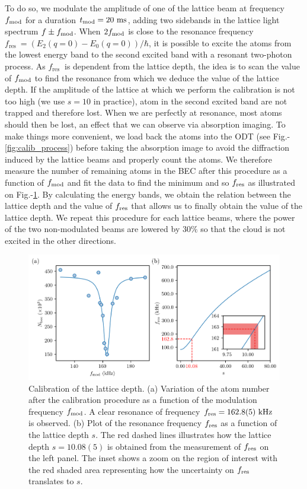 To do so, we modulate the amplitude of one of the lattice beam at frequency $f_{\rm{mod}}$ for a duration $t_{\rm{mod} }= 20 \ \rm{ms}$, adding two sidebands in the lattice light spectrum $f \pm f_{\rm{mod}}$. When $2 f_{\rm{mod}}$ is close to the resonance frequency $f_{\text {res }}=\left(E_{2}(q=0)-E_{0}(q=0)\right)/\hbar$, it is possible to excite the atoms from the lowest energy band to the second excited band with a resonant two-photon process. As $f_{\text {res }}$ is dependent from the lattice depth, the idea is to scan the value of $f_{\rm{mod}}$ to find the resonance from which we deduce the value of the lattice depth. If the amplitude of the lattice at which we perform the calibration is not too high (we use $s= 10$ in practice), atom in the second excited band are not trapped and therefore lost. When we are perfectly at resonance, most atoms should then be lost, an effect that we can observe via absorption imaging. To make things more convenient, we load back the atoms into the ODT (see Fig.-\ref{fig:calib_process}) before taking the absorption image to avoid the diffraction induced by the lattice beams and properly count the atoms. We therefore measure the number of remaining atoms in the BEC after this procedure as a function of $f_{\rm{mod}}$ and fit the data to find the minimum and so $f_{\rm{res}}$ as illustrated on Fig.-\ref{fig:lattice_calibration}. By calculating the energy bands, we obtain the relation between the lattice depth and the value of $f_{\rm{res}}$ that allows us to finally obtain the value of the lattice depth. We repeat this procedure for each lattice beams, where the power of the two non-modulated beams are lowered by $30 \%$ so that the cloud is not excited in the other directions.

\begin{figure}
    \centering
    \includegraphics[width=\textwidth]{Fig/Chapter3/lattice_calibration.png}
    \caption[Calibration of the lattice depth]{Calibration of the lattice depth. (a) Variation of the atom number after the calibration procedure as a function of the modulation frequency $f_{\rm{mod}}$. A clear resonance of frequency $f_{\rm{res}}=162.8(5) \ \rm{kHz}$ is observed. (b) Plot of the resonance frequency $f_{\rm{res}}$ as a function of the lattice depth $s$. The red dashed lines illustrates how the lattice depth $s=10.08(5)$ is obtained from the measurement of $f_{\rm{res}}$ on the left panel. The inset shows a zoom on the region of interest with the red shaded area representing how the uncertainty on $f_{\rm{res}}$ translates to $s$.}
    \label{fig:lattice_calibration}
\end{figure}


